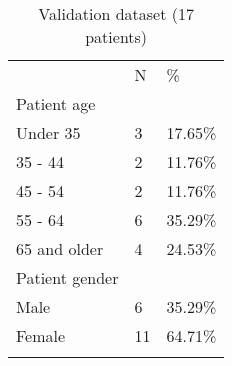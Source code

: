 \begin{table}
  \centering
  \caption{Validation dataset (17 patients)}
\label{tab:patients}       %
\begin{tabular}{lll}
\hline\noalign{\smallskip}
 &  N & \% \\
\noalign{\smallskip}\hline\noalign{\smallskip}
Patient age  & & \\
\hspace{1em} Under 35 & 3 & 17.65\% \\
\hspace{1em} 35 - 44 & 2 & 11.76\% \\
\hspace{1em} 45 - 54 & 2 & 11.76\% \\
\hspace{1em} 55 - 64 & 6 & 35.29\% \\
\hspace{1em} 65 and older & 4 & 24.53\% \\
Patient gender & & \\
\hspace{1em} Male   & 6 & 35.29\% \\
\hspace{1em} Female & 11 & 64.71\% \\
\noalign{\smallskip}\hline
\end{tabular}
\end{table}

